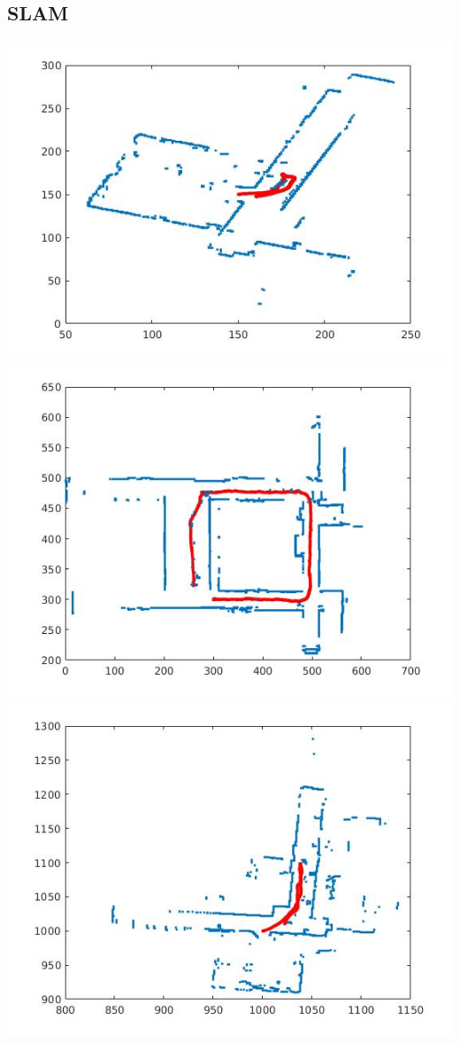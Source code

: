 \documentclass[english]{article}
\begin{document}
\subsection*{SLAM}
\includegraphics[scale=0.8]{map0.jpg}\\
\includegraphics[scale=0.8]{map1.jpg}\\
\includegraphics[scale=0.8]{map2.jpg}\\
\end{document}
